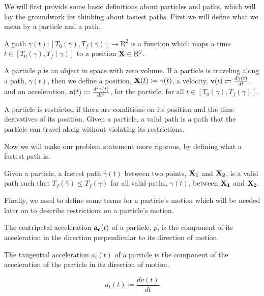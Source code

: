 We will first provide some basic definitions about particles and paths, which will lay the groundwork for thinking about fastest paths. First we will define what we mean by a particle and a path.

\begin{definition}
  A path $\gamma(t): [T_0(\gamma), T_f(\gamma)] \to \mathrm{R}^2$ is a function which maps a time $t \in [T_0(\gamma), T_f(\gamma)]$ to a position $\mathbf{X} \in \mathrm{R}^2$.
\end{definition}

\begin{definition}
  A particle $p$ is an object in space with zero volume. If a particle is traveling along a path, $\gamma(t)$, then we define a position, $\mathbf{X}(t) \coloneqq \gamma(t)$, a velocity, $\mathbf{v}(t) \coloneqq \frac{d\gamma(t)}{dt}$, and an acceleration, $\mathbf{a}(t) \coloneqq \frac{d^2\gamma(t)}{dt^2}$, for the particle, for all $t \in [T_0(\gamma), T_f(\gamma)]$.

  A particle is restricted if there are conditions on its position and the time derivatives of its position. Given a particle, a valid path is a path that the particle can travel along without violating its restrictions.
\end{definition}

Now we will make our problem statement more rigorous, by defining what a fastest path is.

\begin{definition}
  Given a particle, a fastest path $\hat{\gamma}(t)$ between two points, $\mathbf{X_1}$ and $\mathbf{X_2}$, is a valid path such that $T_f(\hat{\gamma}) \leq T_f(\gamma)$ for all valid paths, $\gamma(t)$, between $\mathbf{X_1}$ and $\mathbf{X_2}$.
\end{definition}

Finally, we need to define some terms for a particle's motion which will be needed later on to describe restrictions on a particle's motion.

\begin{definition}
  The centripetal acceleration $\mathbf{a_c}(t)$ of a particle, $p$, is the component of its acceleration in the direction perpendicular to its direction of motion.
\end{definition}

\begin{definition}
  The tangential acceleration $a_t(t)$ of a particle is the component of the acceleration of the particle in its direction of motion.

  \[a_t(t) \coloneqq \frac{dv(t)}{dt}\]
\end{definition}

